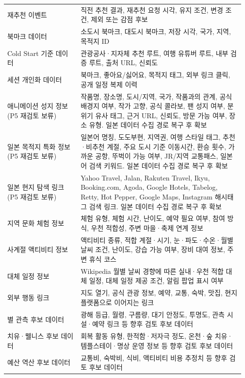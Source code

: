 \documentclass[12pt,a4paper]{article}
\begin{document}
\begin{small}
\begin{longtable}{@{}>{\RaggedRight\arraybackslash}m{0.300\linewidth}>{\RaggedRight\arraybackslash}m{0.672\linewidth}@{}}
재추천 이벤트 & 직전 추천 결과, 재추천 요청 시각, 유지 조건, 변경 조건, 제외 또는 감점 후보 \\
북마크 데이터 & 소도시 북마크, 대도시 북마크, 저장 시각, 국가, 지역, 목적지 ID \\
Cold Start 기준 데이터 & 관광공사·지자체 추천 루트, 여행 유튜버 루트, 내부 검증 루트, 출처 URL, 신뢰도 \\
세션 개인화 데이터 & 북마크, 좋아요/싫어요, 목적지 태그, 외부 링크 클릭, 공개 일정 복제 이력 \\
애니메이션 성지 정보\newline (P5 재검토 보류) & 작품명, 장소명, 도시/지역, 국가, 작품과의 관계, 공식 배경지 여부, 작가 고향, 공식 콜라보, 팬 성지 여부, 분위기 유사 태그, 근거 URL, 신뢰도, 방문 가능 여부, 장소 유형. 일본 데이터 수집 경로 복구 후 확보 \\
일본 목적지 특화 정보\newline (P5 재검토 보류) & 일본어 명칭, 도도부현, 지역권, 여행 스타일 태그, 추천·비추천 계절, 주요 도시 기준 이동시간, 환승 횟수, 가까운 공항, 뚜벅이 가능 여부, JR/지역 교통패스, 일본어 검색 키워드. 일본 데이터 수집 경로 복구 후 확보 \\
일본 현지 탐색 링크\newline (P5 재검토 보류) & Yahoo Travel, Jalan, Rakuten Travel, Ikyu, Booking.com, Agoda, Google Hotels, Tabelog, Retty, Hot Pepper, Google Maps, Instagram 해시태그 검색 링크. 일본 데이터 수집 경로 복구 후 확보 \\
지역 문화 체험 정보 & 체험 유형, 체험 시간, 난이도, 예약 필요 여부, 참여 방식, 우천 적합성, 주변 마을·축제 연계 정보 \\
사계절 액티비티 정보 & 액티비티 종류, 적합 계절·시기, 눈·파도·수온·월별 날씨 조건, 난이도, 강습 가능 여부, 장비 대여 정보, 주변 휴식 코스 \\
대체 일정 정보 & Wikipedia 월별 날씨 경향에 따른 실내·우천 적합 대체 일정, 대체 일정 제공 조건, 알림 팝업 표시 여부 \\
외부 행동 링크 & 지도 열기, 공식 관광 정보, 예약, 교통, 숙박, 맛집, 현지 플랫폼으로 이어지는 링크 \\
별 관측 후보 데이터 & 광해 등급, 월령, 구름량, 대기 안정도, 투명도, 관측 시설·예약 링크 등 향후 검토 후보 데이터 \\
치유·웰니스 후보 데이터 & 회복 활동 유형, 한적함·저자극 정도, 온천·숲 치유·템플스테이·명상 운영 정보 등 향후 검토 후보 데이터 \\
예산 역산 후보 데이터 & 교통비, 숙박비, 식비, 액티비티 비용 추정치 등 향후 검토 후보 데이터 \\

\end{longtable}
\end{small}
\end{document}
